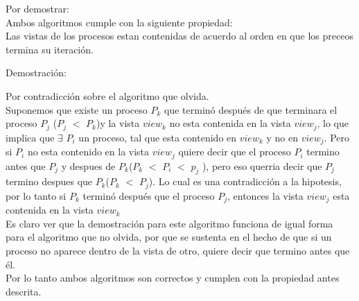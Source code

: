 \documentclass{article}
\begin{document}
\begin{enumerate}
{      Por demostrar:\\
      Ambos algoritmos cumple con la siguiente propiedad:\\
      Las vistas de los procesos estan contenidas de acuerdo al orden
      en que los preceos termina su iteración.

      Demostración:

      Por contradicción sobre el algoritmo que olvida.\\
      Suponemos que existe un proceso $P_k$ que terminó después de que
      terminara el proceso $P_j$ ($P_j$ $<$ $P_k$)y la vista $view_k$ no esta contenida
      en la vista
      $view_j$, lo que implica que $\exists$ $P_i$ un proceso, tal que esta
      contenido en $view_k$ y no en $view_j$. Pero si $P_i$ no esta
      contenido en la vista $view_j$ quiere decir que el proceso $P_i$
      termino antes que $P_j$ y despues de $P_k$($P_k$ $<$ $P_i$ $<$
      $p_j$ ),
      pero eso querria
      decir que $P_j$ termino despues que $P_k$($P_k$ $<$ $P_j$).
      Lo cual es una
      contradicción a la hipotesis, por lo tanto si $P_k$ terminó
      después que el proceso $P_j$, entonces la vista $view_j$ esta
      contenida en la vista $view_k$\\
      Es claro ver que la demostración para este algoritmo funciona de
      igual forma para el algoritmo que no olvida, por que se sustenta
      en el hecho de que si un proceso no aparece dentro de la vista
      de otro, quiere decir que termino antes que él.\\
      Por lo tanto ambos algoritmos son correctos y cumplen con la
      propiedad antes descrita.
      
      
    }    
\end{enumerate}
\end{document}
